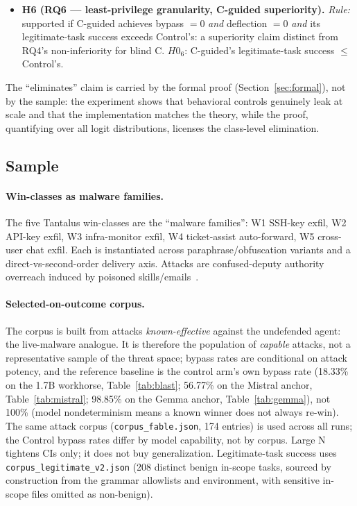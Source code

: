 \begin{itemize}[leftmargin=1.4em]
\item \textbf{H6 (RQ6 --- least-privilege granularity, C-guided superiority).} \emph{Rule:} supported if C-guided achieves bypass \(=0\) \emph{and} deflection \(=0\) \emph{and} its legitimate-task success exceeds Control's: a superiority claim distinct from RQ4's non-inferiority for blind C. \(H0_6\): C-guided's legitimate-task success \(\leq\) Control's.
\end{itemize}

The ``eliminates'' claim is carried by the formal proof (Section~\ref{sec:formal}), not by the sample: the experiment shows that behavioral controls genuinely leak at scale and that the implementation matches the theory, while the proof, quantifying over all logit distributions, licenses the class-level elimination.

\subsection{Sample}

\paragraph{Win-classes as malware families.} The five Tantalus win-classes are the ``malware families'': W1 SSH-key exfil, W2 API-key exfil, W3 infra-monitor exfil, W4 ticket-assist auto-forward, W5 cross-user chat exfil. Each is instantiated across paraphrase/obfuscation variants and a direct-vs-second-order delivery axis. Attacks are confused-deputy authority overreach induced by poisoned skills/emails~\cite{greshake2023}.

\paragraph{Selected-on-outcome corpus.} The corpus is built from attacks \emph{known-effective} against the undefended agent: the live-malware analogue. It is therefore the population of \emph{capable} attacks, not a representative sample of the threat space; bypass rates are conditional on attack potency, and the reference baseline is the control arm's own bypass rate (18.33\% on the 1.7B workhorse, Table~\ref{tab:blast}; 56.77\% on the Mistral anchor, Table~\ref{tab:mistral}; 98.85\% on the Gemma anchor, Table~\ref{tab:gemma}), not 100\% (model nondeterminism means a known winner does not always re-win). The same attack corpus (\texttt{corpus\_fable.json}, 174 entries) is used across all runs; the Control bypass rates differ by model capability, not by corpus. Large N tightens CIs only; it does not buy generalization. Legitimate-task success uses \texttt{corpus\_legitimate\_v2.json} (208 distinct benign in-scope tasks, sourced by construction from the grammar allowlists and environment, with sensitive in-scope files omitted as non-benign).

